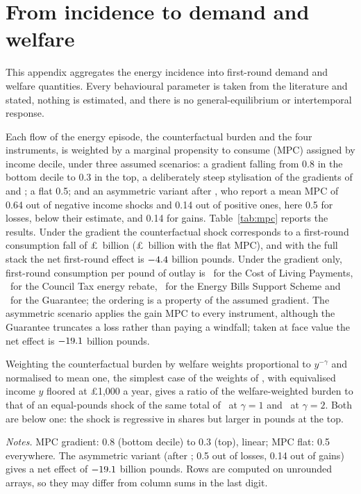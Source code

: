 \FloatBarrier
\section{From incidence to demand and welfare}\label{sec:results-mpc}

This appendix aggregates the energy incidence into first-round demand
and welfare quantities. Every behavioural parameter is taken from the
literature and stated, nothing is estimated, and there is no
general-equilibrium or intertemporal response.

 Each flow of the energy episode, the counterfactual
burden and the four instruments, is weighted by a marginal propensity
to consume (MPC) assigned by income decile, under three assumed
scenarios: a gradient falling from 0.8 in the bottom decile to 0.3 in
the top, a deliberately steep stylisation of the gradients of
\citet{jappelli2014} and \citet{fagereng2021}; a flat 0.5; and an
asymmetric variant after \citet{bunn2018}, who report a mean MPC of
0.64 out of negative income shocks and 0.14 out of positive ones, here
0.5 for losses, below their estimate, and 0.14 for gains.
Table~\ref{tab:mpc} reports the results. Under the gradient the
counterfactual shock corresponds to a first-round consumption fall of
\pounds\SsMpcBurdenGradientBn\ billion (\pounds\SsMpcBurdenFlatBn\
billion with the flat MPC), and with the full stack the net
first-round effect is $-4.4$ billion pounds. Under the
gradient only, first-round consumption per pound of outlay is
\SsMpcColPerPound\ for the Cost of Living Payments,
\SsMpcCtrPerPound\ for the Council Tax energy rebate,
\SsMpcEbssPerPound\ for the Energy Bills Support Scheme and
\SsMpcEpgPerPound\ for the Guarantee; the ordering is a property of
the assumed gradient. The asymmetric scenario applies the gain MPC to
every instrument, although the Guarantee truncates a loss rather than
paying a windfall; taken at face value the net effect is
$-19.1$ billion pounds.

 Weighting the counterfactual burden by
\citet{atkinson1970} welfare weights proportional to $y^{-\gamma}$ and
normalised to mean one, the simplest case of the weights of
\citet{saezstantcheva2016}, with equivalised income $y$ floored at
\pounds 1{,}000 a year, gives a ratio of the welfare-weighted burden
to that of an equal-pounds shock of the same total of
\SsWelfPremiumGammaOne\ at $\gamma=1$ and \SsWelfPremiumGammaTwo\ at
$\gamma=2$. Both are below one: the shock is regressive in shares but
larger in pounds at the top.

\begin{table}[tbp]
\centering
\caption{First-round demand effects of the energy episode under assumed MPC scenarios}
\label{tab:mpc}
\small

\begin{minipage}{.85\textwidth}\footnotesize
\emph{Notes.} MPC gradient: 0.8 (bottom decile) to 0.3 (top), linear;
MPC flat: 0.5 everywhere. The asymmetric variant (after
\citealp{bunn2018}; 0.5 out of losses, 0.14 out of gains) gives a net
effect of $-19.1$ billion pounds. Rows are computed on unrounded
arrays, so they may differ from column sums in the last digit.
\end{minipage}
\end{table}
